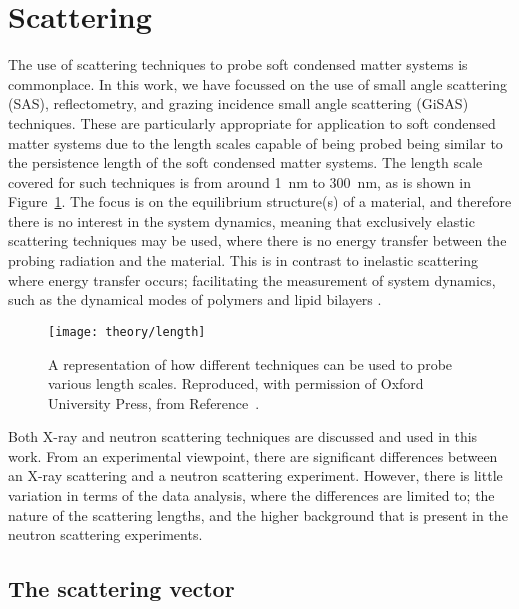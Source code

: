\section{Scattering}
\label{sec:scattering}

The use of scattering techniques to probe soft condensed matter systems is commonplace.
In this work, we have focussed on the use of small angle scattering (SAS), reflectometry, and grazing incidence small angle scattering (GiSAS) techniques.
These are particularly appropriate for application to soft condensed matter systems due to the length scales capable of being probed being similar to the persistence length of the soft condensed matter systems.
The length scale covered for such techniques is from around \SI{1}{\nano\metre} to \SI{300}{\nano\metre}, as is shown in Figure~\ref{fig:lengths}.
The focus is on the equilibrium structure(s) of a material, and therefore there is no interest in the system dynamics, meaning that exclusively elastic scattering techniques may be used, where there is no energy transfer between the probing radiation and the material.
This is in contrast to inelastic scattering where energy transfer occurs; facilitating the measurement of system dynamics, such as the dynamical modes of polymers and lipid bilayers \cite{garcia_sakai_quasielastic_2009, farago_recent_2009}.
%
\begin{figure}
    \centering
    \texttt{[image: theory/length]}
    \caption{A representation of how different techniques can be used to probe various length scales. Reproduced, with permission of Oxford University Press\textsuperscript{\textcopyright}, from Reference~\cite{sivia_elementary_2011}.}
    \label{fig:lengths}
\end{figure}
%

Both X-ray and neutron scattering techniques are discussed and used in this work.
From an experimental viewpoint, there are significant differences between an X-ray scattering and a neutron scattering experiment.
However, there is little variation in terms of the data analysis, where the differences are limited to; the nature of the scattering lengths, and the higher background that is present in the neutron scattering experiments.

\subsection{The scattering vector}

